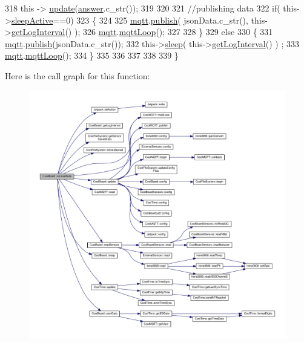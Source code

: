 \begin{DoxyCode}
318     \textcolor{keyword}{this} -> \hyperlink{classCoolBoard_a8612756d3f73198cdde857a66f0fe690}{update}(\hyperlink{classCoolBoard_a7b835fafd449e5282f7f91d787a2dc15}{answer}.c\_str());
319     
320 
321     \textcolor{comment}{//publishing data   }
322     \textcolor{keywordflow}{if}( this->\hyperlink{classCoolBoard_a0a51b2287139f66c738101fb53139230}{sleepActive}==0)    
323     \{   
324         
325         \hyperlink{classCoolBoard_a2399f44d7c23c1149a335cb3b46d90f1}{mqtt}.\hyperlink{classCoolMQTT_ace977b3e90ab14b1199fe5c4fb0a13ec}{publish}( jsonData.c\_str(), this->\hyperlink{classCoolBoard_aaa24480b273fc095a1356a589c333781}{getLogInterval}() );
326         \hyperlink{classCoolBoard_a2399f44d7c23c1149a335cb3b46d90f1}{mqtt}.\hyperlink{classCoolMQTT_aa5eaae967b562b62cbcf2b8d81f6e5d5}{mqttLoop}();
327     
328     \}
329     \textcolor{keywordflow}{else}
330     \{
331         \hyperlink{classCoolBoard_a2399f44d7c23c1149a335cb3b46d90f1}{mqtt}.\hyperlink{classCoolMQTT_ace977b3e90ab14b1199fe5c4fb0a13ec}{publish}(jsonData.c\_str());      
332         this->\hyperlink{classCoolBoard_a5d0c8ff93b615efd676be432de9f164a}{sleep}( this->\hyperlink{classCoolBoard_aaa24480b273fc095a1356a589c333781}{getLogInterval}() ) ;
333         \hyperlink{classCoolBoard_a2399f44d7c23c1149a335cb3b46d90f1}{mqtt}.\hyperlink{classCoolMQTT_aa5eaae967b562b62cbcf2b8d81f6e5d5}{mqttLoop}();
334     \}
335 
336     
337         
338         
339 \}
\end{DoxyCode}
Here is the call graph for this function\+:
\nopagebreak
\begin{figure}[H]
\begin{center}
\leavevmode
\includegraphics[width=350pt]{classCoolBoard_aa0bbc4bc605e35618d18e68795c61363_cgraph}
\end{center}
\end{figure}
\mbox{\label{classCoolBoard_a486507b8f0981d3cc671ed31c2145755}} 
